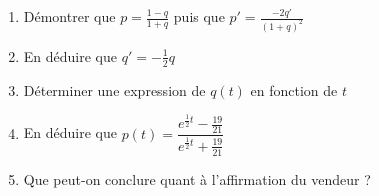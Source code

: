 \documentclass[oneside,12pt]{article}          %
\begin{document}
\begin{enumerate}
    \item Démontrer que $p=\frac{1-q}{1+q}$ puis que $p'=\frac{-2q'}{(1+q)^2}$
    \item En déduire que $q'=-\frac{1}{2}q$
    \item Déterminer une expression de $q(t)$ en fonction de $t$
    \item En déduire que $p(t)=\dfrac{e^{\frac{1}{2}t}-\frac{19}{21}}{e^{\frac{1}{2}t}+\frac{19}{21}}$
    \item Que peut-on conclure quant à l'affirmation du vendeur ?
\end{enumerate}
\end{document}
